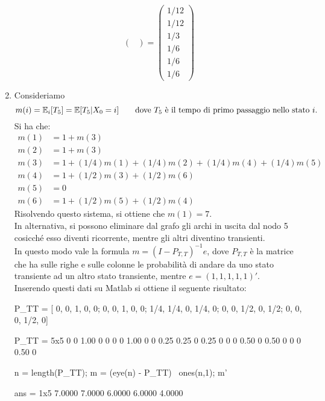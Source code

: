 \documentclass[
	12pt, %
]{fphw}
\begin{document}
\begin{enumerate}
\begin{equation*}
\begin{pmatrix}
		\end{pmatrix}
		=
		\begin{pmatrix}
			1/12 \\ 1/12 \\ 1/3 \\ 1/6 \\ 1/6 \\ 1/6
		\end{pmatrix}
	\end{equation*}
	\item Consideriamo
	\begin{equation*}
		m(i) = \mathbb{E}_i [T_5] = \mathbb{E}[T_5 | X_0 = i] \qquad \textnormal{dove }T_5\textnormal{ è il tempo di primo passaggio nello stato }i.
	\end{equation*}
	Si ha che:
	\begin{align*}
		m(1) &= 1 + m(3)\\
		m(2) &= 1 + m(3)\\
		m(3) &= 1 + (1/4)m(1) + (1/4)m(2) + (1/4)m(4) + (1/4)m(5)\\
		m(4) &= 1 + (1/2)m(3) + (1/2)m(6)\\
		m(5) &= 0\\
		m(6) &= 1 + (1/2)m(5) + (1/2)m(4)
	\end{align*}
	Risolvendo questo sistema, si ottiene che $m(1) = 7$.\\
	In alternativa, si possono eliminare dal grafo gli archi in uscita dal nodo 5 cosicché esso diventi ricorrente, mentre gli altri diventino transienti.\\
	In questo modo vale la formula $m = (I - P_{T,T})^{-1}e$,
	dove $P_{T,T}$ è la matrice che ha sulle righe e sulle colonne le probabilità di andare da uno stato transiente ad un altro stato transiente,
	mentre $e = (1, 1, 1, 1, 1)'$.\\
	Inserendo questi dati su Matlab si ottiene il seguente risultato:
	\begin{matlabcode}
		P_TT = [
			0, 0, 1, 0, 0;
			0, 0, 1, 0, 0;
			1/4, 1/4, 0, 1/4, 0;
			0, 0, 1/2, 0, 1/2;
			0, 0, 0, 1/2, 0]
		\end{matlabcode}
		\begin{matlaboutput}
		P_TT = 5x5    
				0         0      1.00      0      0
				0         0      1.00      0      0
				0.25      0.25   0         0.25   0
				0         0      0.50      0      0.50
				0         0      0         0.50   0
		
		\end{matlaboutput}
		\begin{matlabcode}
		n = length(P_TT);
		m = (eye(n) - P_TT) \ ones(n,1);
		m'
		\end{matlabcode}
		\begin{matlaboutput}
		ans = 1x5    
			7.0000    7.0000    6.0000    6.0000    4.0000
		

\end{matlaboutput}
\end{enumerate}
\end{document}
